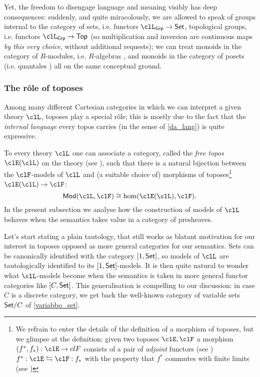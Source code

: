 Yet, the freedom to disengage language and meaning visibly has deep consequences: suddenly, and quite miracolously, we are allowed to speak of groups internal to the category of sets, i.e. functors $\clL_{\cate{Grp}} \to \Set$, topological groups, i.e. functors $\clL_{\cate{Grp}} \to \cate{Top}$ (so multiplication and inversion are continuous maps \emph{by this very choice}, without additional requests); we can treat monoids in the category of $R$-modules, i.e. $R$-algebras \cite[]{}, and monoids in the category of posets \cite{} (i.e. quantales \cite{}) all on the same conceptual ground.

\subsubsection{The r\^ole of toposes}
Among many different Cartesian categories in which we can interpret a given theory $\clL$, toposes play a special r\^ole; this is mostly due to the fact that the \emph{internal language} every topos carries (in the sense of \autoref{da_lang}) is quite expressive.

To every theory $\clL$ one can associate a category, called the \emph{free topos} $\clE(\clL)$ on the theory (see \cite{lambek1988introduction}), such that there is a natural bijection between the $\clF$-models of $\clL$ and (a suitable choice of) morphisms of toposes\footnote{We refrain to enter the details of the definition of a morphism of toposes, but we glimpse at the definition: given two toposes $\clE,\clF$ a morphism $(f^*,f_*): \clE \to clF$ consists of a pair of \emph{adjoint} functors (see \cite[3]{Bor1}) $f^*: \clE \leftrightarrows \clF: f_*$ with the property that $f^*$ commutes with finite limits (see \cite[2.8.2]{Bor1})} $\clE(\clL) \to \clF$:
\[\cate{Mod}(\clL, \clF) \cong \hom(\clE(\clL), \clF).\]
In the present subsection we analyse how the construction of models of $\clL$ behaves when the semantics takes value in a category of presheaves.

Let's start stating a plain tautology, that still works as blatant motivation for our interest in toposes opposed as more general categories for our semantics. Sets can be canonically identified with the category $[1,\mathsf{Set}]$, so models of $\clL$ are tautologically identified to its $[1,\mathsf{Set}]$-models. It is then quite natural to wonder what $\clL$-models become when the semantics is taken in more general functor categories like $[C,\mathsf{Set}]$. This generalisation is compelling to our discussion: in case $C$ is a discrete category, we get back the well-known category of variable sets $\mathsf{Set}/C$ of \autoref{variabbo_set}.


